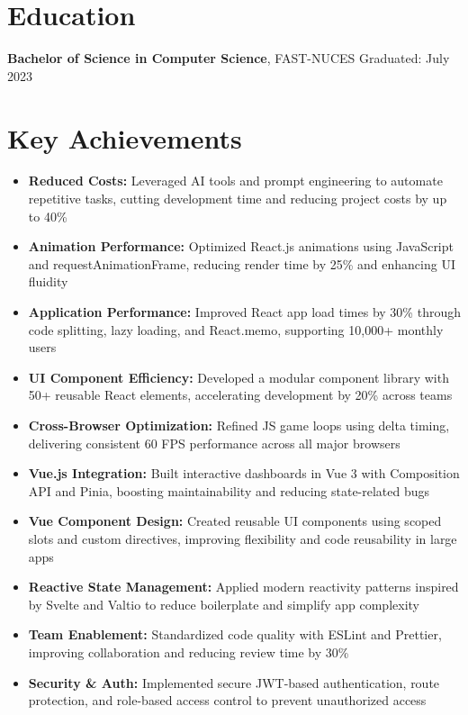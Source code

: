 \documentclass[11pt]{article}
\begin{document}
\section{Education}
\textbf{Bachelor of Science in Computer Science}, FAST-NUCES \hfill Graduated: July 2023 \\

\section{Key Achievements}
\begin{itemize}
\item \textbf{Reduced Costs:} Leveraged AI tools and prompt engineering to automate repetitive tasks, cutting development time and reducing project costs by up to 40\%
\item \textbf{Animation Performance:} Optimized React.js animations using JavaScript and requestAnimationFrame, reducing render time by 25\% and enhancing UI fluidity
\item \textbf{Application Performance:} Improved React app load times by 30\% through code splitting, lazy loading, and React.memo, supporting 10,000+ monthly users
\item \textbf{UI Component Efficiency:} Developed a modular component library with 50+ reusable React elements, accelerating development by 20\% across teams
\item \textbf{Cross-Browser Optimization:} Refined JS game loops using delta timing, delivering consistent 60 FPS performance across all major browsers
\item \textbf{Vue.js Integration:} Built interactive dashboards in Vue 3 with Composition API and Pinia, boosting maintainability and reducing state-related bugs
\item \textbf{Vue Component Design:} Created reusable UI components using scoped slots and custom directives, improving flexibility and code reusability in large apps
\item \textbf{Reactive State Management:} Applied modern reactivity patterns inspired by Svelte and Valtio to reduce boilerplate and simplify app complexity
\item \textbf{Team Enablement:} Standardized code quality with ESLint and Prettier, improving collaboration and reducing review time by 30\%
\item \textbf{Security \& Auth:} Implemented secure JWT-based authentication, route protection, and role-based access control to prevent unauthorized access
\end{itemize}
\end{document}
